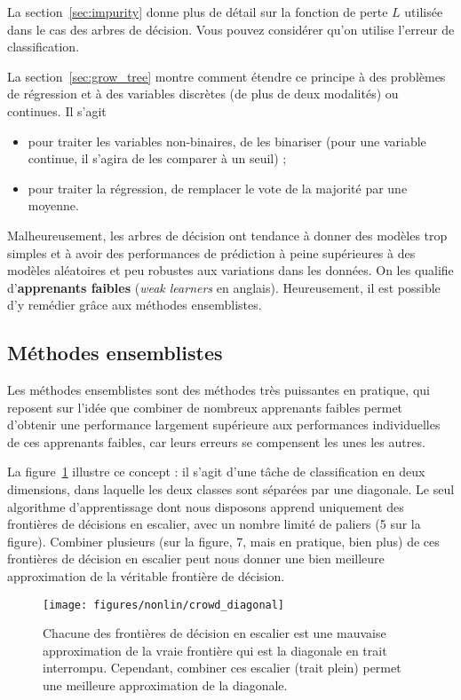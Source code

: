 La section~\ref{sec:impurity} donne plus de détail sur la fonction de perte $L$
utilisée dans le cas des arbres de décision. Vous pouvez considérer qu'on
utilise l'erreur de classification.

La section~\ref{sec:grow_tree} montre comment étendre ce principe à des
problèmes de régression et à des variables discrètes (de plus de deux
modalités) ou continues. Il s'agit
\begin{itemize}
\item pour traiter les variables non-binaires, de les binariser (pour une
  variable continue, il s'agira de les comparer à un seuil) ;
\item pour traiter la régression, de remplacer le vote de la majorité par une
  moyenne.
\end{itemize}

Malheureusement, les arbres de décision ont tendance à donner des modèles trop
simples et à avoir des performances de prédiction à peine supérieures à des
modèles aléatoires et peu robustes aux variations dans les données. On les
qualifie d'\textbf{apprenants faibles} ({\it weak learners} en
anglais). Heureusement, il est possible d'y remédier grâce aux méthodes
ensemblistes.


\subsection{Méthodes ensemblistes}
Les méthodes ensemblistes sont des méthodes très puissantes en pratique, qui
reposent sur l'idée que combiner de nombreux apprenants faibles permet
d'obtenir une performance largement supérieure aux performances individuelles
de ces apprenants faibles, car leurs erreurs se compensent les unes les autres.

\begin{exemple}
  La figure~\ref{fig:crowd_diagonal} illustre ce concept : il s'agit d'une
  tâche de classification en deux dimensions, dans laquelle les deux classes
  sont séparées par une diagonale. Le seul algorithme d'apprentissage dont nous
  disposons apprend uniquement des frontières de décisions en escalier, avec un
  nombre limité de paliers (5 sur la figure). Combiner plusieurs (sur la
  figure, 7, mais en pratique, bien plus) de ces frontières de décision en
  escalier peut nous donner une bien meilleure approximation de la véritable
  frontière de décision.
\end{exemple}

\begin{figure}[h]
  \centering
  \texttt{[image: figures/nonlin/crowd\_diagonal]}
  \caption{Chacune des frontières de décision en escalier est une mauvaise
    approximation de la vraie frontière qui est la diagonale en trait
    interrompu. Cependant, combiner ces escalier (trait plein) permet une
    meilleure approximation de la diagonale.}
  \label{fig:crowd_diagonal}
\end{figure}


